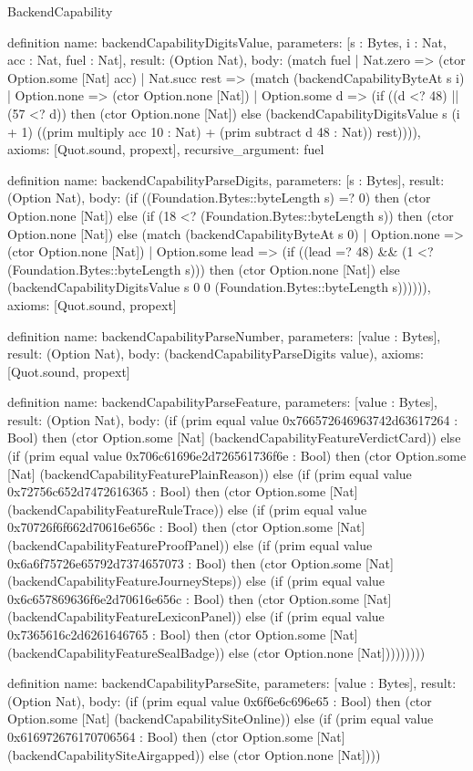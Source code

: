 \begin{lexlean}{BackendCapability}
\begin{semanticmodule}
definition{
  name: backendCapabilityDigitsValue,
  parameters: [s : Bytes, i : Nat, acc : Nat, fuel : Nat],
  result: (Option Nat),
  body: (match fuel
    | Nat.zero => (ctor Option.some [Nat] acc)
    | Nat.succ rest => (match (backendCapabilityByteAt s i)
      | Option.none => (ctor Option.none [Nat])
      | Option.some d => (if ((d <? 48) || (57 <? d)) then (ctor Option.none [Nat]) else (backendCapabilityDigitsValue s (i + 1) ((prim multiply acc 10 : Nat) + (prim subtract d 48 : Nat)) rest)))),
  axioms: [Quot.sound, propext],
  recursive_argument: fuel
}

definition{
  name: backendCapabilityParseDigits,
  parameters: [s : Bytes],
  result: (Option Nat),
  body: (if ((Foundation.Bytes::byteLength s) =? 0) then (ctor Option.none [Nat]) else (if (18 <? (Foundation.Bytes::byteLength s)) then (ctor Option.none [Nat]) else (match (backendCapabilityByteAt s 0)
    | Option.none => (ctor Option.none [Nat])
    | Option.some lead => (if ((lead =? 48) && (1 <? (Foundation.Bytes::byteLength s))) then (ctor Option.none [Nat]) else (backendCapabilityDigitsValue s 0 0 (Foundation.Bytes::byteLength s)))))),
  axioms: [Quot.sound, propext]
}

definition{
  name: backendCapabilityParseNumber,
  parameters: [value : Bytes],
  result: (Option Nat),
  body: (backendCapabilityParseDigits value),
  axioms: [Quot.sound, propext]
}

definition{
  name: backendCapabilityParseFeature,
  parameters: [value : Bytes],
  result: (Option Nat),
  body: (if (prim equal value 0x766572646963742d63617264 : Bool) then (ctor Option.some [Nat] (backendCapabilityFeatureVerdictCard)) else (if (prim equal value 0x706c61696e2d726561736f6e : Bool) then (ctor Option.some [Nat] (backendCapabilityFeaturePlainReason)) else (if (prim equal value 0x72756c652d7472616365 : Bool) then (ctor Option.some [Nat] (backendCapabilityFeatureRuleTrace)) else (if (prim equal value 0x70726f6f662d70616e656c : Bool) then (ctor Option.some [Nat] (backendCapabilityFeatureProofPanel)) else (if (prim equal value 0x6a6f75726e65792d7374657073 : Bool) then (ctor Option.some [Nat] (backendCapabilityFeatureJourneySteps)) else (if (prim equal value 0x6c657869636f6e2d70616e656c : Bool) then (ctor Option.some [Nat] (backendCapabilityFeatureLexiconPanel)) else (if (prim equal value 0x7365616c2d6261646765 : Bool) then (ctor Option.some [Nat] (backendCapabilityFeatureSealBadge)) else (ctor Option.none [Nat]))))))))
}

definition{
  name: backendCapabilityParseSite,
  parameters: [value : Bytes],
  result: (Option Nat),
  body: (if (prim equal value 0x6f6e6c696e65 : Bool) then (ctor Option.some [Nat] (backendCapabilitySiteOnline)) else (if (prim equal value 0x616972676170706564 : Bool) then (ctor Option.some [Nat] (backendCapabilitySiteAirgapped)) else (ctor Option.none [Nat])))
}


\end{semanticmodule}
\end{lexlean}
